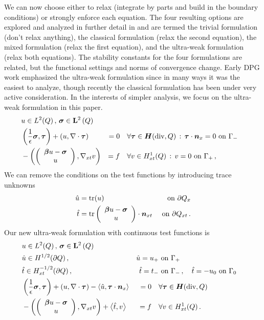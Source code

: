 \documentclass{article}
\begin{document}
We can now choose either to relax (integrate by parts and build in the boundary conditions) or strongly enforce each equation. 
The four resulting options are explored and analyzed in further detail in \cite{VariousVariational} 
and are termed the trivial formulation (don't relax anything), the classical formulation (relax the second equation), 
the mixed formulation (relax the first equation), and the ultra-weak formulation (relax both equations).
The stability constants for the four formulations are related, but the functional settings and norms of convergence change.
Early DPG work emphasized the ultra-weak formulation since in many ways it was the easiest to analyze, 
though recently the classical formulation has been under very active consideration.
In the interests of simpler analysis, we focus on the ultra-weak formulation in this paper.
\begin{equation}
\label{eq:confusionUltraWeakBF}
	\begin{aligned}
		&u\in L^2(Q)\,,\,\boldsymbol\sigma\in\mathbf{L}^2\left( Q \right)\\
		&\left( \frac{1}{\epsilon}\boldsymbol\sigma,\boldsymbol\tau \right)+\left( u,\nabla\cdot\boldsymbol\tau \right)&=0\quad&\forall\boldsymbol\tau\in\mbox{\boldmath $H$}(\text{div},Q)\,:\,\boldsymbol\tau\cdot\boldsymbol n_x=0\text{ on }\Gamma_-\\
		&-\left( \left( \begin{array}{c} \boldsymbol\beta u-\boldsymbol\sigma\\ u\\ \end{array} \right),\nabla_{xt} v \right)&=f\quad&\forall v\in H^1_{xt}(Q)\,:\,v=0\text{ on }\Gamma_+\,,
	\end{aligned}
\end{equation}
We can remove the conditions on the test functions by introducing trace unknowns 
\begin{align*}
\hat u&=\operatorname*{tr}(u)&\text{ on }\partial Q_x\\
\hat t&=\operatorname*{tr}\left( \begin{array}{c} \boldsymbol\beta u-\boldsymbol\sigma\\ u\\ \end{array} \right)\cdot\boldsymbol n_{xt}&\text{ on }\partial Q_{xt}\,.
\end{align*}
Our new ultra-weak formulation with continuous test functions is
\begin{equation}
\label{eq:confusionUltraWeakContinuousBF}
	\begin{aligned}
		&u\in L^2(Q)\,,\,\boldsymbol\sigma\in\mathbf{L}^2\left( Q \right)\\
		&\hat u\in H^{1/2}(\partial Q)\,,\,&\hat u=u_+&\text{ on }\Gamma_+\\
		&\hat t\in H^{-1/2}_{xt}(\partial Q)\,,\,&\hat t=t_-&\text{ on }\Gamma_-\,,\quad\hat t=-u_0\text{ on }\Gamma_0\\
		&\left( \frac{1}{\epsilon}\boldsymbol\sigma,\boldsymbol\tau \right)+\left( u,\nabla\cdot\boldsymbol\tau \right)-\left\langle \hat u,\boldsymbol\tau\cdot\boldsymbol n_x \right\rangle&=0\quad&\forall\boldsymbol\tau\in\mbox{\boldmath $H$}(\text{div},Q)\\
		&-\left( \left( \begin{array}{c} \boldsymbol\beta u-\boldsymbol\sigma\\ u\\ \end{array} \right),\nabla_{xt} v \right)+\left\langle \hat t,v \right\rangle&=f\quad&\forall v\in H^1_{xt}(Q)\,.
	\end{aligned}
\end{equation}
\end{document}
